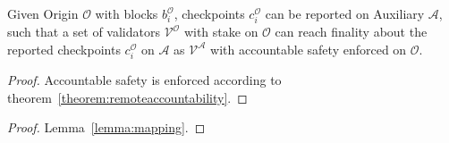 \documentclass[12pt,a4paper]{article}
\newcommand{\A}{\mathcal{A}}
\newcommand{\OC}{\mathcal{O}}
\newcommand{\V}{\mathcal{V}}
\begin{document}
\begin{theorem}
	\label{theorem:simulatedfinality}
	Given Origin $\OC$ with blocks $b^{\OC}_i$, checkpoints $c^{\OC}_i$ can be reported on Auxiliary $\A$, such that a set of validators $\V^\OC$ with stake on $\OC$ can reach finality about the reported checkpoints $c^{\OC}_i$ on $\A$ as $\V^\A$ with accountable safety enforced on $\OC$.
	\begin{proof}
		Accountable safety is enforced according to theorem~\ref{theorem:remoteaccountability}.
		
	\end{proof}
\end{theorem}

\begin{theorem}
	\label{theorem:leveragedsecurity}
	\begin{proof}
		Lemma~\ref{lemma:mapping}.
	\end{proof}
\end{theorem}
\end{document}
